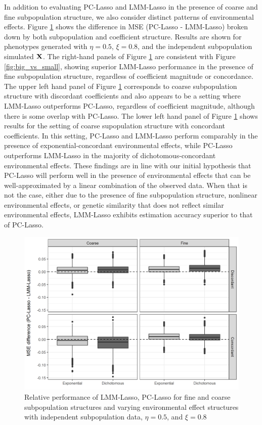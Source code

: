 In addition to evaluating PC-Lasso and LMM-Lasso in the presence of coarse and fine subpopulation structure, we also consider distinct patterns of environmental effects. Figure \ref{fig:big_small_gamma} shows the difference in MSE (PC-Lasso - LMM-Lasso) broken down by both subpopulation and coefficient structure. Results are shown for phenotypes generated with $\eta = 0.5$, $\xi = 0.8$, and the independent subpopulation simulated $\textbf{X}$. The right-hand panels of Figure \ref{fig:big_small_gamma} are consistent with Figure \ref{fig:big_vs_small}, showing superior LMM-Lasso performance in the presence of fine subpopulation structure, regardless of coefficient magnitude or concordance. The upper left hand panel of Figure \ref{fig:big_small_gamma} corresponds to coarse subpopulation structure with discordant coefficients and also appears to be a setting where LMM-Lasso outperforms PC-Lasso, regardless of coefficient magnitude, although there is some overlap with PC-Lasso. The lower left hand panel of Figure \ref{fig:big_small_gamma} shows results for the setting of coarse supopulation structure with concordant coefficients. In this setting, PC-Lasso and LMM-Lasso perform comparably in the presence of exponential-concordant environmental effects, while PC-Lasso outperforms LMM-Lasso in the majority of dichotomous-concordant environmental effects. These findings are in line with our initial hypothesis that PC-Lasso will perform well in the presence of environmental effects that can be well-approximated by a linear combination of the observed data. When that is not the case, either due to the presence of fine subpopulation structure, nonlinear environmental effects, or genetic similarity that does not reflect similar environmental effects, LMM-Lasso exhibits estimation accuracy superior to that of PC-Lasso.

\begin{figure}[H]
    \centering
    \includegraphics[scale = 0.9]{figures/mse_diff_hetero.png}
    \caption{Relative performance of LMM-Lasso, PC-Lasso for fine and coarse subpopulation structures and varying environmental effect structures with independent subpopulation data, $\eta = 0.5$, and $\xi = 0.8$}
    \label{fig:big_small_gamma}
\end{figure}

